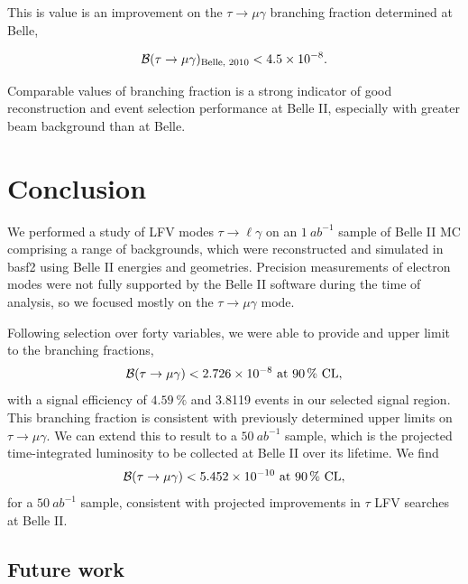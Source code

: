 \documentclass[12pt]{thesis}  %
\begin{document}
This is value is an improvement on the $\tau\to\mu\gamma$ branching fraction determined at Belle,

\begin{equation*}
\mathcal{B}(\tau\to\mu\gamma)_{\text{Belle, 2010}}<\num{4.5d-8}.
\end{equation*}

Comparable values of branching fraction is a strong indicator of good reconstruction and event selection performance at Belle II, especially with greater beam background than at Belle. 


\pagebreak


\chapter{Conclusion}

We performed a study of LFV modes $\tau\to\ell\gamma$ on an $\SI{1}{ab^{-1}}$ sample of Belle II MC comprising a range of backgrounds, which were reconstructed and simulated in basf2 using Belle II energies and geometries. Precision measurements of electron modes were not fully supported by the Belle II software during the time of analysis, so we focused mostly on the $\tau\to\mu\gamma$ mode. 

Following selection over forty variables, we were able to provide and upper limit to the branching fractions,
\begin{equation*}
\mathcal{B}(\tau\to\mu\gamma) < \num{2.726d-8}\text{ at }\SI{90}{\percent}\text{ CL},
\end{equation*}
with a signal efficiency of $\SI{4.59}{\percent}$ and 3.8119 events in our selected signal region. This branching fraction is consistent with previously determined upper limits on $\tau\to\mu\gamma$. We can extend this to result to a $\SI{50}{ab^{-1}}$ sample, which is the projected time-integrated luminosity to be collected at Belle II over its lifetime. We find
\begin{equation*}
\mathcal{B}(\tau\to\mu\gamma) < \num{5.452d-10}\text{ at }\SI{90}{\percent}\text{ CL},
\end{equation*}
for a $\SI{50}{ab^{-1}}$ sample, consistent with projected improvements in $\tau$ LFV searches at Belle II.

\section{Future work}
\end{document}
